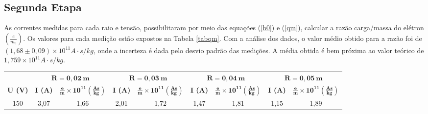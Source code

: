 \documentclass{article}
\begin{document}
\subsection{Segunda Etapa}

As correntes medidas para cada raio e tensão, possibilitaram por meio das equações (\ref{b0}) e (\ref{qm}), calcular a razão carga/massa do elétron $\left ( \frac{e}{m _0}\right )$. Os valores para cada medição estão expostos na Tabela \ref{tabqm}. Com a análise dos dados, o valor médio obtido para a razão foi de $(1,68 \pm 0,09) \times 10 ^{11} A \cdot s/kg$, onde a incerteza é dada pelo desvio padrão das medições. A média obtida é bem próxima ao valor teórico de $1,759 \times 10 ^{11} A \cdot s/kg$.

\begin{table}[hb]
\centering
\begin{tabular}{|c|c|c|c|c|c|c|c|c|}
\hline
                                 & \multicolumn{2}{c|}{\cellcolor[HTML]{9B9B9B}\textbf{$\mathbf{R=0,02 \ m}$}}                                                                    & \multicolumn{2}{c|}{\cellcolor[HTML]{9B9B9B}\textbf{$\mathbf{R=0,03 \ m}$}}                                                                    & \multicolumn{2}{c|}{\cellcolor[HTML]{9B9B9B}\textbf{$\mathbf{R=0,04 \ m}$}}                                                                    & \multicolumn{2}{c|}{\cellcolor[HTML]{9B9B9B}\textbf{$\mathbf{R=0,05\ m}$}}                                                                    \\ \cline{2-9} 
\multirow{-2}{*}{\textbf{U (V)}} & \cellcolor[HTML]{EFEFEF}\textbf{I (A)} & \cellcolor[HTML]{EFEFEF}\textbf{$\mathbf{\frac{e}{m} \times 10^{11} \left ( \frac{As}{kg} \right)}$} & \cellcolor[HTML]{EFEFEF}\textbf{I (A)} & \cellcolor[HTML]{EFEFEF}\textbf{$\mathbf{\frac{e}{m} \times 10^{11} \left ( \frac{As}{kg} \right)}$} & \cellcolor[HTML]{EFEFEF}\textbf{I (A)} & \cellcolor[HTML]{EFEFEF}\textbf{$\mathbf{\frac{e}{m} \times 10^{11} \left ( \frac{As}{kg} \right)}$} & \cellcolor[HTML]{EFEFEF}\textbf{I (A)} & \cellcolor[HTML]{EFEFEF}\textbf{$\mathbf{\frac{e}{m} \times 10^{11} \left ( \frac{As}{kg} \right)}$} \\ \hline
150                              & 3,07                                   & 1,66                                                                                  & 2,01                                   & 1,72                                                                                  & 1,47                                   & 1,81                                                                                  & 1,15                                   & 1,89                                                                                  \\ \hline

\end{tabular}
\end{table}
\end{document}
